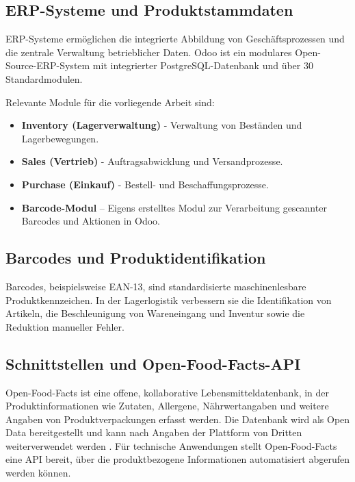 \documentclass[12pt,a4paper]{article}
\begin{document}
\subsection{ERP-Systeme und Produktstammdaten}

ERP-Systeme ermöglichen die integrierte Abbildung von Geschäftsprozessen und die zentrale Verwaltung betrieblicher Daten. Odoo ist ein modulares Open-Source-ERP-System mit integrierter PostgreSQL-Datenbank und über 30 Standardmodulen.

Relevante Module für die vorliegende Arbeit sind:

\begin{itemize}
    \item \textbf{Inventory (Lagerverwaltung)} - Verwaltung von Beständen und Lagerbewegungen.
    \item \textbf{Sales (Vertrieb)} - Auftragsabwicklung und Versandprozesse.
    \item \textbf{Purchase (Einkauf)} - Bestell- und Beschaffungsprozesse.
    \item \textbf{Barcode-Modul} -- Eigens erstelltes Modul zur Verarbeitung gescannter Barcodes und Aktionen in Odoo. \autocite[Vgl.][]{OdooDocumentationOdoo}
\end{itemize}

\subsection{Barcodes und Produktidentifikation}

Barcodes, beispielsweise EAN-13, sind standardisierte maschinenlesbare Produktkennzeichen. In der Lagerlogistik verbessern sie die Identifikation von Artikeln, die Beschleunigung von Wareneingang und Inventur sowie die Reduktion manueller Fehler. \autocite[Vgl.][]{ISOIEC15420}

\subsection{Schnittstellen und Open-Food-Facts-API}

Open-Food-Facts ist eine offene, kollaborative Lebensmitteldatenbank, in der Produktinformationen wie Zutaten, Allergene, Nährwertangaben und weitere Angaben von Produktverpackungen erfasst werden. Die Datenbank wird als Open Data bereitgestellt und kann nach Angaben der Plattform von Dritten weiterverwendet werden \autocite{openfoodfacts2026api}. Für technische Anwendungen stellt Open-Food-Facts eine API bereit, über die produktbezogene Informationen automatisiert abgerufen werden können.
\end{document}
